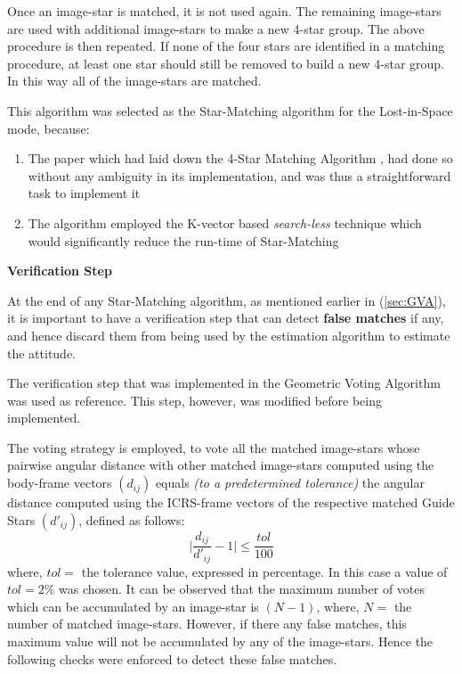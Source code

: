 \documentclass[../../main.tex]{subfiles}
\begin{document}
Once an image-star is matched, it is not used again. The remaining image-stars are used with additional image-stars to make a new 4-star group. The above procedure is then repeated.
If none of the four stars are identified in a matching procedure, at least one star should still be removed to build a new 4-star group. In this way all of the image-stars are matched.

This algorithm was selected as the Star-Matching algorithm for the Lost-in-Space mode, because:
\begin{enumerate}
    \item The paper which had laid down the 4-Star Matching Algorithm \cite{dong2006brightness}, had done so without any ambiguity in its implementation, and was thus a straightforward task to implement it
    \item The algorithm employed the K-vector based \textit{search-less} technique which would significantly reduce the run-time of Star-Matching
\end{enumerate}

\textbf{Verification Step}

At the end of any Star-Matching algorithm, as mentioned earlier in (\ref{sec:GVA}), it is important to have a verification step that can detect \textbf{false matches} if any, and hence discard them from being used by the estimation algorithm to estimate the attitude.

The verification step that was implemented in the Geometric Voting Algorithm \cite{kolomenkin2008geometric} was used as reference. This step, however, was modified before being implemented.

The voting strategy is employed, to vote all the matched image-stars whose pairwise angular distance with other matched image-stars computed using the body-frame vectors $(d_{ij})$ equals \textit{(to a predetermined tolerance)} the angular distance computed using the ICRS-frame vectors of the respective matched Guide Stars $(d'_{ij})$, defined as follows:
\begin{equation}
    \bigg|\frac{d_{ij}}{d'_{ij}} - 1\bigg| \le \frac{tol}{100}
    \label{eq:ST_Verify_Tol}
\end{equation}
where, $tol=$ the tolerance value, expressed in percentage. In this case a value of $tol=2\%$ was chosen.
It can be observed that the maximum number of votes which can be accumulated by an image-star is $(N-1)$, where, $N=$ the number of matched image-stars. However, if there any false matches, this maximum value will not be accumulated by any of the image-stars. Hence the following checks were enforced to detect these false matches.
\end{document}
